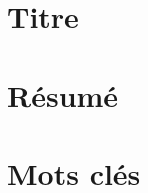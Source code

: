 \begin{titlepage}
\begin{center}
\section*{Titre}
\section*{Résumé}
\section*{Mots clés}
\end{center}
\end{titlepage}
